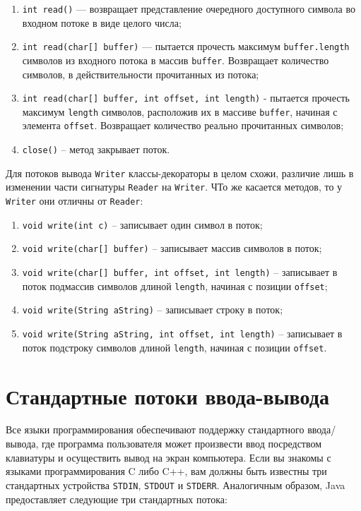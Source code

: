 \documentclass{report}
\begin{document}
\begin{enumerate}
    \item \verb|int read()| — возвращает представление очередного доступного символа во входном потоке в виде целого числа;
    \item \verb|int read(char[] buffer)| — пытается прочесть максимум \verb|buffer.length| символов из входного потока в массив \verb|buffer|. Возвращает количество символов, в действительности прочитанных из потока;
    \item \verb|int read(char[] buffer, int offset, int length)| - пытается прочесть максимум \verb|length| символов, расположив их в массиве \verb|buffer|, начиная с элемента \verb|offset|. Возвращает количество реально прочитанных символов;
    \item \verb|close()| – метод закрывает поток.
\end{enumerate}

Для потоков вывода \verb|Writer| классы-декораторы в целом схожи, различие лишь в изменении части сигнатуры \verb|Reader| на \verb|Writer|. ЧТо же касается методов, то у \verb|Writer| они отличны от \verb|Reader|:

\begin{enumerate}
    \item \verb|void write(int c)| – записывает один символ в поток;
    \item \verb|void write(char[] buffer)| – записывает массив символов в поток;
    \item \verb|void write(char[] buffer, int offset, int length)| – записывает в поток подмассив символов длиной \verb|length|, начиная с позиции \verb|offset|;
    \item \verb|void write(String aString)| – записывает строку в поток;
    \item \verb|void write(String aString, int offset, int length)| – записывает в поток подстроку символов длиной \verb|length|, начиная с позиции \verb|offset|.
\end{enumerate}

\section{Стандартные потоки ввода-вывода}

Все языки программирования обеспечивают поддержку стандартного ввода/вывода, где программа пользователя может произвести ввод посредством клавиатуры и осуществить вывод на экран компьютера. Если вы знакомы с языками программирования C либо C++, вам должны быть известны три стандартных устройства \verb|STDIN|, \verb|STDOUT| и \verb|STDERR|. Аналогичным образом, Java предоставляет следующие три стандартных потока:
\end{document}
